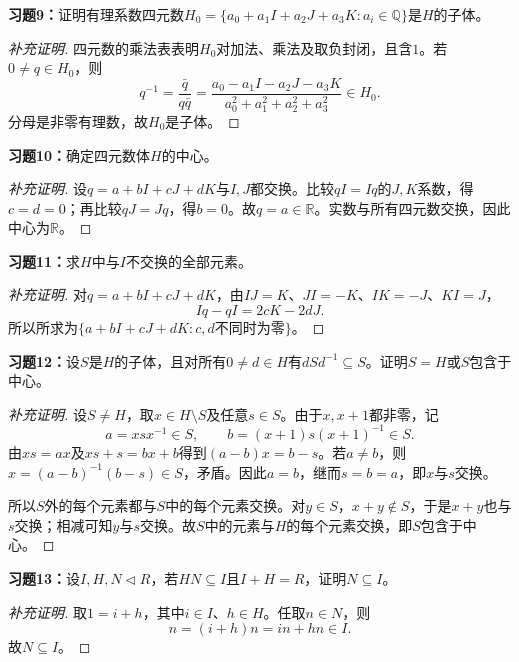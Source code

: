 \begin{problem}
\textbf{习题9：}证明有理系数四元数$H_0=\{a_0+a_1I+a_2J+a_3K:a_i\in\mathbb Q\}$是$H$的子体。
\end{problem}
\begin{proof}[补充证明]
四元数的乘法表表明$H_0$对加法、乘法及取负封闭，且含$1$。若$0\ne q\in H_0$，则
\[
q^{-1}=\frac{\bar q}{q\bar q}
=\frac{a_0-a_1I-a_2J-a_3K}{a_0^2+a_1^2+a_2^2+a_3^2}\in H_0.
\]
分母是非零有理数，故$H_0$是子体。
\end{proof}

\begin{problem}
\textbf{习题10：}确定四元数体$H$的中心。
\end{problem}
\begin{proof}[补充证明]
设$q=a+bI+cJ+dK$与$I,J$都交换。比较$qI=Iq$的$J,K$系数，得$c=d=0$；再比较$qJ=Jq$，得$b=0$。故$q=a\in\mathbb R$。实数与所有四元数交换，因此中心为$\mathbb R$。
\end{proof}

\begin{problem}
\textbf{习题11：}求$H$中与$I$不交换的全部元素。
\end{problem}
\begin{proof}[补充证明]
对$q=a+bI+cJ+dK$，由$I J=K$、$J I=-K$、$I K=-J$、$K I=J$，
\[
Iq-qI=2cK-2dJ.
\]
所以所求为$\{a+bI+cJ+dK:c,d\text{不同时为零}\}$。
\end{proof}

\begin{problem}
\textbf{习题12：}设$S$是$H$的子体，且对所有$0\ne d\in H$有$dSd^{-1}\subseteq S$。证明$S=H$或$S$包含于中心。
\end{problem}
\begin{proof}[补充证明]
设$S\ne H$，取$x\in H\setminus S$及任意$s\in S$。由于$x,x+1$都非零，记
\[
a=xsx^{-1}\in S,\qquad b=(x+1)s(x+1)^{-1}\in S.
\]
由$xs=ax$及$xs+s=bx+b$得到$(a-b)x=b-s$。若$a\ne b$，则$x=(a-b)^{-1}(b-s)\in S$，矛盾。因此$a=b$，继而$s=b=a$，即$x$与$s$交换。

所以$S$外的每个元素都与$S$中的每个元素交换。对$y\in S$，$x+y\notin S$，于是$x+y$也与$s$交换；相减可知$y$与$s$交换。故$S$中的元素与$H$的每个元素交换，即$S$包含于中心。
\end{proof}

\begin{problem}
\textbf{习题13：}设$I,H,N\lhd R$，若$HN\subseteq I$且$I+H=R$，证明$N\subseteq I$。
\end{problem}
\begin{proof}[补充证明]
取$1=i+h$，其中$i\in I$、$h\in H$。任取$n\in N$，则
\[
n=(i+h)n=in+hn\in I.
\]
故$N\subseteq I$。
\end{proof}

